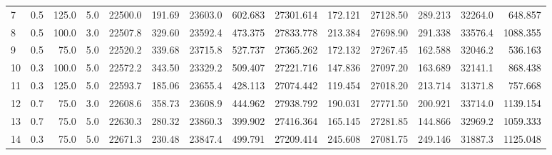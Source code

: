 \begin{tabular}{lrrrrrrrrrrrrr}
7  & 0.5    & 125.0 & 5.0     & 22500.0                                          & 191.69                         & 23603.0                           & 602.683                          & 27301.614 & 172.121 & 27128.50 & 289.213 & 32264.0 & 648.857 \\
8  & 0.5    & 100.0 & 3.0     & 22507.8                                          & 329.60                         & 23592.4                           & 473.375                          & 27833.778 & 213.384 & 27698.90 & 291.338 & 33576.4 & 1088.355 \\
9  & 0.5    & 75.0  & 5.0     & 22520.2                                          & 339.68                         & 23715.8                           & 527.737                          & 27365.262 & 172.132 & 27267.45 & 162.588 & 32046.2 & 536.163 \\
10 & 0.3    & 100.0 & 5.0     & 22572.2                                          & 343.50                         & 23329.2                           & 509.407                          & 27221.716 & 147.836 & 27097.20 & 163.689 & 32141.1 & 868.438 \\
11 & 0.3    & 125.0 & 5.0     & 22593.7                                          & 185.06                         & 23655.4                           & 428.113                          & 27074.442 & 119.454 & 27018.20 & 213.714 & 31371.8 & 757.668 \\
12 & 0.7    & 75.0  & 3.0     & 22608.6                                          & 358.73                         & 23608.9                           & 444.962                          & 27938.792 & 190.031 & 27771.50 & 200.921 & 33714.0 & 1139.154 \\
13 & 0.7    & 75.0  & 5.0     & 22630.3                                          & 280.32                         & 23860.3                           & 399.902                          & 27416.364 & 165.145 & 27281.85 & 144.866 & 32969.2 & 1059.333 \\
14 & 0.3    & 75.0  & 5.0     & 22671.3                                          & 230.48                         & 23847.4                           & 499.791                          & 27209.414 & 245.608 & 27081.75 & 249.146 & 31887.3 & 1125.048 \\
\bottomrule
\end{tabular}
